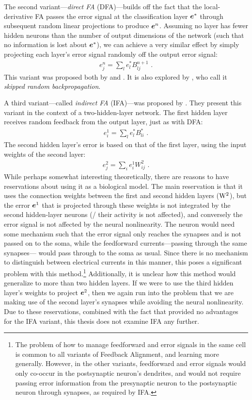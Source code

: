 The second variant---\emph{direct FA} (DFA)---builds off the fact that
the local-derivative FA passes the error signal at the classification layer $\boldsymbol{e}^*$
through subsequent random linear projections to produce $\boldsymbol{e}^n$.
Assuming no layer has fewer hidden neurons
than the number of output dimensions of the network
(such that no information is lost about $\boldsymbol{e}^*$),
we can achieve a very similar effect by simply projecting each layer's error
signal randomly off the output error signal:
\begin{align}
  e^n_j = \sum_l e^*_l B^{n+1}_{lj} \text{ .}
\end{align}
This variant was proposed both by \textcite{Lillicrap2016} and \textcite{Nokland2016}.
It is also explored by \textcite{Baldi2016},
who call it \emph{skipped random backpropagation}.

A third variant---called \emph{indirect FA} (IFA)---was proposed by \textcite{Nokland2016}.
They present this variant in the context of a two-hidden-layer network.
The first hidden layer receives random feedback from the output layer,
just as with DFA:
\begin{align}
  e^1_i = \sum_l e^*_l B^*_{li} \text{ .}
\end{align}
The second hidden layer's error is based on that of the first layer,
using the input weights of the second layer:
\begin{align}
  e^2_j = \sum_i e^1_i W^2_{ij} \text{ .}
\end{align}
While perhaps somewhat interesting theoretically,
there are reasons to have reservations about using it as a biological model.
The main reservation is that it uses the connection weights
between the first and second hidden layers ($\mathrm{W}^2$),
but the error $\boldsymbol{e}^1$ that is projected through these weights
is not integrated by the second hidden-layer neurons
(\ie/ their activity is not affected),
and conversely the error signal is not affected by the neural nonlinearity.
The neuron would need some mechanism such that the error signal
only reaches the synapses and is not passed on to the soma,
while the feedforward currents---passing through the same synapses---%
would pass through to the soma as usual.
Since there is no mechanism to distinguish between electrical currents
in this manner, this poses a significant problem with this method.\footnote{
  The problem of how to manage feedforward and error signals in the same
  cell is common to all variants of Feedback Alignment,
  and learning more generally.
  However, in the other variants,
  feedforward and error signals would only
  co-occur in the postsynaptic neuron's dendrites,
  and would not require passing error information from
  the presynaptic neuron to the postsynaptic neuron through synapses,
  as required by IFA.}
Additionally, it is unclear how this method would generalize
to more than two hidden layers.
If we were to use the third hidden layer's weights to project $\boldsymbol{e}^2$,
then we again run into the problem that we are making use
of the second layer's synapses while avoiding the neural nonlinearity.
Due to these reservations,
combined with the fact that \textcite{Nokland2016}
provided no advantages for the IFA variant,
this thesis does not examine IFA any further.

